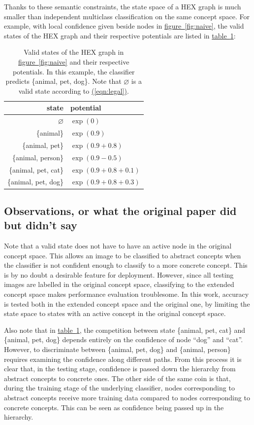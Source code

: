 \documentclass[11pt,a4paper]{article}
\begin{document}
Thanks to these semantic constraints, the state space of a HEX graph is much smaller than independent multiclass classification on the same concept space. For example, with local confidence given beside nodes in \hyperref[fig:naive]{figure~\ref{fig:naive}}, the valid states of the HEX graph and their respective potentials are listed in \hyperref[tab:naive]{table~\ref{tab:naive}}:

\begin{table}[h]
\centering
\begin{tabular}{r|l}
state & potential\\
\hline
$\varnothing$ & $\exp(0)$\\
\{animal\} & $\exp(0.9)$\\
\{animal, pet\} & $\exp(0.9+0.8)$\\
\{animal, person\} & $\exp(0.9-0.5)$\\
\{animal, pet, cat\} & $\exp(0.9+0.8+0.1)$\\
\{animal, pet, dog\} & $\exp(0.9+0.8+0.3)$
\end{tabular}
\caption{Valid states of the HEX graph in \hyperref[fig:naive]{figure~\ref{fig:naive}} and their respective potentials. In this example, the classifier predicts \{animal, pet, dog\}. Note that $\varnothing$ is a valid state according to \hyperref[eqn:legal]{(\ref{eqn:legal})}.}
\label{tab:naive}
\end{table}

\subsection{Observations, or what the original paper did but didn't say}

Note that a valid state does not have to have an active node in the original concept space. This allows an image to be classified to abstract concepts when the classifier is not confident enough to classify to a more concrete concept. This is by no doubt a desirable feature for deployment. However, since all testing images are labelled in the original concept space, classifying to the extended concept space makes performance evaluation troublesome. In this work, accuracy is tested both in the extended concept space and the original one, by limiting the state space to states with an active concept in the original concept space.

Also note that in \hyperref[tab:naive]{table~\ref{tab:naive}}, the competition between state \{animal, pet, cat\} and \{animal, pet, dog\} depends entirely on the confidence of node ``dog'' and ``cat''. However, to discriminate between \{animal, pet, dog\} and \{animal, person\} requires examining the confidence along different paths. From this process it is clear that, in the testing stage, confidence is passed down the hierarchy from abstract concepts to concrete ones. The other side of the same coin is that, during the training stage of the underlying classifier, nodes corresponding to abstract concepts receive more training data compared to nodes corresponding to concrete concepts. This can be seen as confidence being passed up in the hierarchy.
\end{document}
